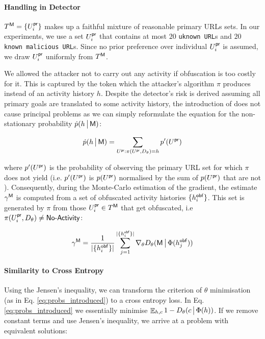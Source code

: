 \paragraph{Handling \NA in Detector}
$T^{\mathsf{M}} = \{ U_i^{\mathsf{pr}}\} $ makes up a faithful mixture of reasonable primary URLs sets. In our experiments, we use a set $U_i^{\mathsf{pr}}$ that contains at most $20$ \texttt{uknown URL}s and $20$ \texttt{known malicious URL}s. Since no prior preference over individual $U_i^{\mathsf{pr}}$ is assumed, we draw $U_i^{\mathsf{pr}}$ uniformly from $T^{\mathsf{M}}$.

We allowed the attacker not to carry out any activity if obfuscation is too costly for it. This is captured by the \NA token which the attacker's algorithm $\pi$ produces instead of an activity history $h$. Despite the detector's risk is derived assuming all primary goals are translated to some activity history, the introduction of \NA does not cause principal problems as we can simply reformulate the equation for the non-stationary probability $\dot{p}(h \,\big|\, \mathsf{M})$:

\begin{equation}
    \dot{p}(h \,\big|\, \mathsf{M}) = \sum_{U^{\mathsf{pr}}: \pi(U^{\mathsf{pr}}, D_\theta) = h} p'(U^{\mathsf{pr}})
\end{equation}

where $p'(U^{\mathsf{pr}})$ is the probability of observing the primary URL set for which $\pi$ does not yield \NA (i.e. $p'(U^{\mathsf{pr}})$ is $p(U^{\mathsf{pr}})$ normalised by the sum of $p(U^{\mathsf{pr}})$ that are not \NA). Consequently, during the Monte-Carlo estimation of the gradient, the estimate $\gamma^{\mathsf{M}}$ is computed from a set of obfuscated activity histories $\{ h^{\mathsf{obf}}_i \}$. This set is generated by $\pi$ from those $U^{\mathsf{pr}}_i \in T^{\mathsf{M}}$ that get obfuscated, i.e $\pi(U^{\mathsf{pr}}_i, D_\theta) \neq \textsf{No-Activity}$:

\begin{equation}
    \gamma^{\mathsf{M}} = \frac{1}{ |\{ h^{\mathsf{obf}}_i \}| } \sum_{j=1}^{ |\{ h^{\mathsf{obf}}_i \}| } \nabla_\theta D_\theta(\mathsf{M} \,\big|\, \Phi(h^{\mathsf{obf}}_j))
\end{equation}

\paragraph{Similarity to Cross Entropy}
Using the Jensen's inequality, we can transform the criterion of $\theta$ minimisation (as in Eq. \eqref{eq:probs_introduced}) to a cross entropy loss. In Eq. \eqref{eq:probs_introduced} we essentially minimise $\mathop{\mathbb{E}}_{h,c} 1 - D_\theta (c \,\big|\, \Phi(h))$. If we remove constant terms and use Jensen's inequality, we arrive at a problem with equivalent solutions:

